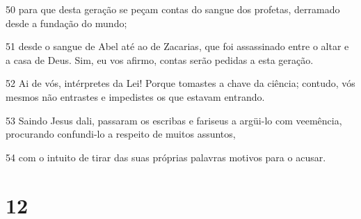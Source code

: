 \par 50 para que desta geração se peçam contas do sangue dos profetas, derramado desde a fundação do mundo;
\par 51 desde o sangue de Abel até ao de Zacarias, que foi assassinado entre o altar e a casa de Deus. Sim, eu vos afirmo, contas serão pedidas a esta geração.
\par 52 Ai de vós, intérpretes da Lei! Porque tomastes a chave da ciência; contudo, vós mesmos não entrastes e impedistes os que estavam entrando.
\par 53 Saindo Jesus dali, passaram os escribas e fariseus a argüi-lo com veemência, procurando confundi-lo a respeito de muitos assuntos,
\par 54 com o intuito de tirar das suas próprias palavras motivos para o acusar.

\chapter{12}

